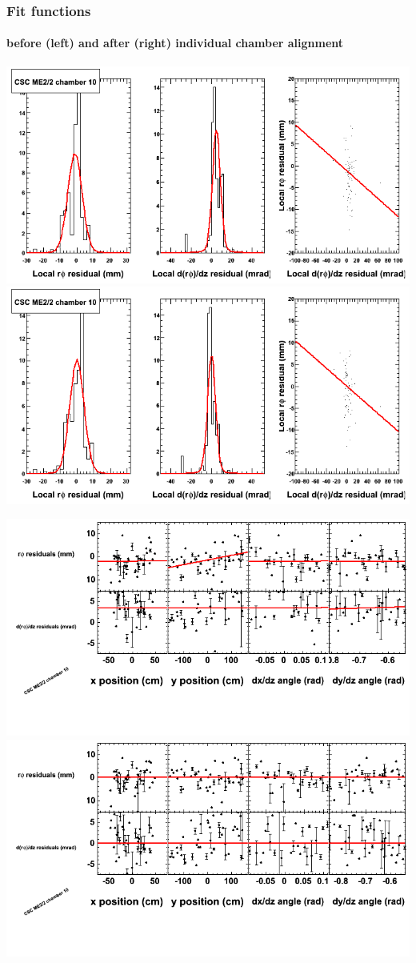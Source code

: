 \documentclass[compress]{beamer}
\begin{document}
\begin{frame}
\frametitle{Fit functions}
\framesubtitle{before (left) and after (right) individual chamber alignment}
\includegraphics[width=0.5\linewidth]{ringfits_3dof/beforefit_MEp22_10_bellcurve.png} \includegraphics[width=0.5\linewidth]{ringfits_3dof/afterfit_MEp22_10_bellcurve.png}

\includegraphics[width=0.5\linewidth]{ringfits_3dof/beforefit_MEp22_10_polynomials.png} \includegraphics[width=0.5\linewidth]{ringfits_3dof/afterfit_MEp22_10_polynomials.png}
\end{frame}
\end{document}
